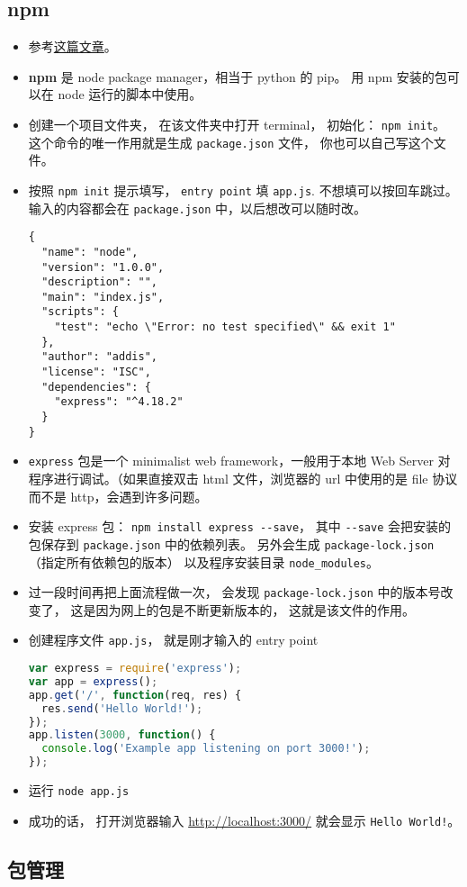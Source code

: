 \subsection{npm}
\begin{itemize}
\item 参考\href{https://medium.com/@adnanrahic/hello-world-app-with-node-js-and-express-c1eb7cfa8a30}{这篇文章}。
\item \textbf{npm} 是 node package manager，相当于 python 的 pip。 用 npm 安装的包可以在 node 运行的脚本中使用。
\item 创建一个项目文件夹， 在该文件夹中打开 terminal， 初始化： \verb|npm init|。 这个命令的唯一作用就是生成 \verb`package.json` 文件， 你也可以自己写这个文件。
\item 按照 \verb|npm init| 提示填写， \verb|entry point| 填 \verb`app.js`. 不想填可以按回车跳过。 输入的内容都会在 \verb|package.json| 中，以后想改可以随时改。
\begin{lstlisting}[language=none,caption=package.json 示例]
{
  "name": "node",
  "version": "1.0.0",
  "description": "",
  "main": "index.js",
  "scripts": {
    "test": "echo \"Error: no test specified\" && exit 1"
  },
  "author": "addis",
  "license": "ISC",
  "dependencies": {
    "express": "^4.18.2"
  }
}
\end{lstlisting}
\item \verb|express| 包是一个 minimalist web framework，一般用于本地 Web Server 对程序进行调试。（如果直接双击 html 文件，浏览器的 url 中使用的是 file 协议而不是 http，会遇到许多问题。
\item 安装 express 包： \verb|npm install express --save|， 其中 \verb|--save| 会把安装的包保存到 \verb|package.json| 中的依赖列表。 另外会生成 \verb|package-lock.json| （指定所有依赖包的版本） 以及程序安装目录 \verb|node_modules|。
\item 过一段时间再把上面流程做一次， 会发现 \verb|package-lock.json| 中的版本号改变了， 这是因为网上的包是不断更新版本的， 这就是该文件的作用。
\item 创建程序文件 \verb|app.js|， 就是刚才输入的 entry point
\begin{lstlisting}[language=js]
var express = require('express');
var app = express();
app.get('/', function(req, res) {
  res.send('Hello World!');
});
app.listen(3000, function() {
  console.log('Example app listening on port 3000!');
});
\end{lstlisting}
\item 运行 \verb|node app.js|
\item 成功的话， 打开浏览器输入 \href{http://localhost:3000/}{http://localhost:3000/} 就会显示 \verb|Hello World!|。
\end{itemize}

\subsection{包管理}